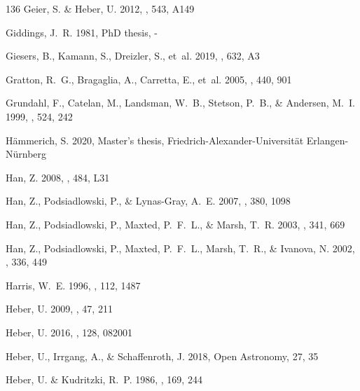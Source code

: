 \documentclass{aa}
\begin{document}
\begin{thebibliography}{136}
{Geier}, S. \& {Heber}, U. 2012, \aap, 543, A149

{Giddings}, J.~R. 1981, PhD thesis, -

{Giesers}, B., {Kamann}, S., {Dreizler}, S., {et~al.} 2019, \aap, 632, A3

{Gratton}, R.~G., {Bragaglia}, A., {Carretta}, E., {et~al.} 2005, \aap, 440,
  901

{Grundahl}, F., {Catelan}, M., {Landsman}, W.~B., {Stetson}, P.~B., \&
  {Andersen}, M.~I. 1999, \apj, 524, 242

{H\"ammerich}, S. 2020, Master's thesis, Friedrich-Alexander-Universität
  Erlangen-Nürnberg

{Han}, Z. 2008, \aap, 484, L31

{Han}, Z., {Podsiadlowski}, P., \& {Lynas-Gray}, A.~E. 2007, \mnras, 380, 1098

{Han}, Z., {Podsiadlowski}, P., {Maxted}, P.~F.~L., \& {Marsh}, T.~R. 2003,
  \mnras, 341, 669

{Han}, Z., {Podsiadlowski}, P., {Maxted}, P.~F.~L., {Marsh}, T.~R., \&
  {Ivanova}, N. 2002, \mnras, 336, 449

{Harris}, W.~E. 1996, \aj, 112, 1487

{Heber}, U. 2009, \araa, 47, 211

{Heber}, U. 2016, \pasp, 128, 082001

{Heber}, U., {Irrgang}, A., \& {Schaffenroth}, J. 2018, Open Astronomy, 27, 35

{Heber}, U. \& {Kudritzki}, R.~P. 1986, \aap, 169, 244


\end{thebibliography}
\end{document}
